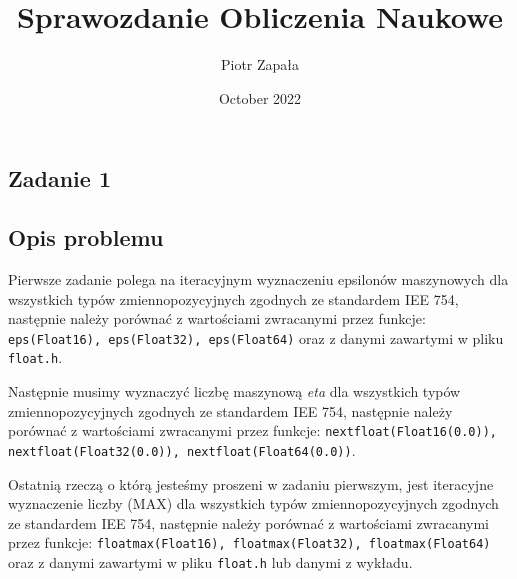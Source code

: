 \documentclass{article}
\title{Sprawozdanie Obliczenia Naukowe}
\author{Piotr Zapała}
\date{October 2022}
\begin{document}
\maketitle

\tableofcontents
\newpage
\begin{center}
    \section{Zadanie 1}
    \subsection{Opis problemu}
    \large Pierwsze zadanie polega na iteracyjnym wyznaczeniu epsilonów maszynowych
     dla wszystkich typów zmiennopozycyjnych zgodnych ze standardem IEE 754, następnie należy
     porównać z wartościami zwracanymi przez funkcje: \texttt{eps(Float16), eps(Float32), eps(Float64)} 
     oraz z danymi zawartymi w pliku \texttt{float.h}.\vspace*{2mm}

     Następnie musimy wyznaczyć liczbę maszynową \textit{eta}
     dla wszystkich typów zmiennopozycyjnych zgodnych ze standardem IEE 754, następnie należy
     porównać z wartościami zwracanymi przez funkcje: \texttt{nextfloat(Float16(0.0)), nextfloat(Float32(0.0)), nextfloat(Float64(0.0))}.\vspace*{2mm}

     Ostatnią rzeczą o którą jesteśmy proszeni w zadaniu pierwszym, jest iteracyjne wyznaczenie liczby (MAX)
     dla wszystkich typów zmiennopozycyjnych zgodnych ze standardem IEE 754, następnie należy
     porównać z wartościami zwracanymi przez funkcje: \texttt{floatmax(Float16), floatmax(Float32), floatmax(Float64)} 
     oraz z danymi zawartymi w pliku \texttt{float.h} lub danymi z wykładu.\vspace*{2mm}

\end{center}
\end{document}
